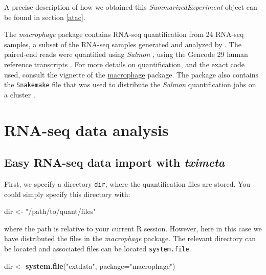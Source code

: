 \documentclass[
  9pt,
  a4paper,
]{extarticle}
\newenvironment{Shaded}{\begin{snugshade}}{\end{snugshade}}
\newcommand{\DataTypeTok}[1]{\textcolor[rgb]{0.13,0.29,0.53}{#1}}
\newcommand{\KeywordTok}[1]{\textcolor[rgb]{0.13,0.29,0.53}{\textbf{#1}}}
\newcommand{\NormalTok}[1]{#1}
\newcommand{\StringTok}[1]{\textcolor[rgb]{0.31,0.60,0.02}{#1}}
\begin{document}
A precise description of how we obtained this \emph{SummarizedExperiment} object can
be found in section \ref{atac}.

The \emph{macrophage} package contains RNA-seq quantification from 24 RNA-seq
samples, a subset of the RNA-seq samples generated and analyzed by \citet{alasoo}. The
paired-end reads were quantified using \emph{Salmon} \citep{salmon}, using the Gencode 29
human reference transcripts \citep{gencode}. For more details on quantification, and
the exact code used, consult the vignette of the
\href{http://bioconductor.org/packages/macrophage}{macrophage} package. The package
also contains the \texttt{Snakemake} file that was used to distribute the \emph{Salmon}
quantification jobs on a cluster \citep{snakemake}.

\hypertarget{rna-seq-data-analysis}{%
\section{RNA-seq data analysis}\label{rna-seq-data-analysis}}

\hypertarget{easy-rna-seq-data-import-with-tximeta}{%
\subsection{\texorpdfstring{Easy RNA-seq data import with \emph{tximeta}}{Easy RNA-seq data import with tximeta}}\label{easy-rna-seq-data-import-with-tximeta}}

First, we specify a directory \texttt{dir}, where the quantification files are stored.
You could simply specify this directory with:

\begin{Shaded}
\begin{Highlighting}[]
\NormalTok{dir <-}\StringTok{ "/path/to/quant/files"}
\end{Highlighting}
\end{Shaded}

where the path is relative to your current R session. However, here in this
case we have distributed the files in the \emph{macrophage} package. The relevant
directory can be located and associated files can be located \texttt{system.file}.

\begin{Shaded}
\begin{Highlighting}[]
\NormalTok{dir <-}\StringTok{ }\KeywordTok{system.file}\NormalTok{(}\StringTok{"extdata"}\NormalTok{, }\DataTypeTok{package=}\StringTok{"macrophage"}\NormalTok{)}
\end{Highlighting}
\end{Shaded}
\end{document}
